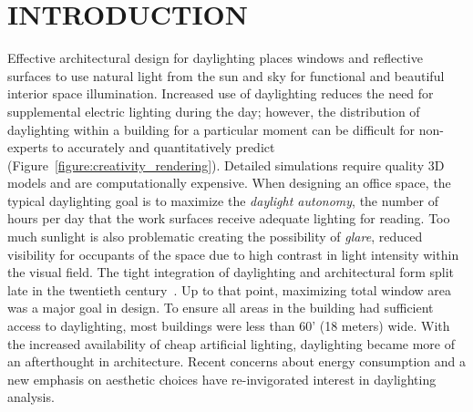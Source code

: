 \documentclass[preprint]{elsarticle}
\begin{document}
\section{INTRODUCTION}
Effective architectural design for daylighting places windows and
reflective surfaces to use natural light from the sun and sky for
functional and beautiful interior space illumination.  Increased use
of daylighting reduces the need for supplemental electric lighting
during the day; however, the distribution of daylighting within a
building for a particular moment can be difficult for non-experts to
accurately and quantitatively predict
(Figure~\ref{figure:creativity_rendering}).  Detailed simulations
require quality 3D models and are computationally expensive.  When
designing an office space, the typical daylighting goal is to maximize
the {\em daylight autonomy}, the number of hours per day that the
work surfaces receive adequate lighting for reading\cite{citeulike:10035387}.   
Too much sunlight is also
problematic creating the possibility of {\em glare}, reduced
visibility for occupants of the space due to high contrast in light
intensity within the visual field.
%
The tight integration of daylighting and architectural form split late
in the twentieth century~\cite{lechner2001heating}.  Up to that point,
maximizing total window area was a major goal in design.  To ensure
all areas in the building had sufficient access to daylighting, most
buildings were less than 60' (18 meters) wide.  With the increased
availability of cheap artificial lighting, daylighting became more of
an afterthought in architecture.  Recent concerns about energy
consumption and a new emphasis on aesthetic choices have
re-invigorated interest in daylighting analysis.





\end{document}
